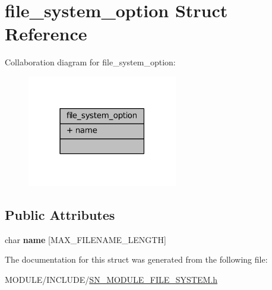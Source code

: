 \hypertarget{structfile__system__option}{}\section{file\+\_\+system\+\_\+option Struct Reference}
\label{structfile__system__option}


Collaboration diagram for file\+\_\+system\+\_\+option\+:\nopagebreak
\begin{figure}[H]
\begin{center}
\leavevmode
\includegraphics[width=186pt]{structfile__system__option__coll__graph}
\end{center}
\end{figure}
\subsection*{Public Attributes}
\begin{DoxyCompactItemize}
\item 
\mbox{\label{structfile__system__option_a97947f2f8ece15fab99009f23cd2348b}} 
char {\bfseries name} \mbox{[}M\+A\+X\+\_\+\+F\+I\+L\+E\+N\+A\+M\+E\+\_\+\+L\+E\+N\+G\+TH\mbox{]}
\end{DoxyCompactItemize}


The documentation for this struct was generated from the following file\+:\begin{DoxyCompactItemize}
\item 
M\+O\+D\+U\+L\+E/\+I\+N\+C\+L\+U\+D\+E/\hyperlink{SN__MODULE__FILE__SYSTEM_8h}{S\+N\+\_\+\+M\+O\+D\+U\+L\+E\+\_\+\+F\+I\+L\+E\+\_\+\+S\+Y\+S\+T\+E\+M.\+h}\end{DoxyCompactItemize}

